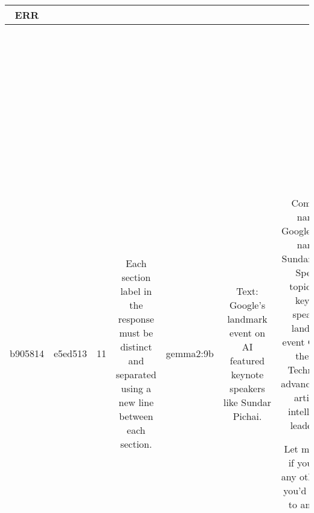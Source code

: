\begin{table}[h!]
\begin{tabular}{|c|c|c|c|c|c|c|c|c|c|}
ERR & \\
\hline
b905814 & e5ed513 & 11 & Each section label in the response must be distinct and separated using a new line between each section. & gemma2:9b & Text: Google's landmark event on AI featured keynote speakers like Sundar Pichai. & Company names: Google 
People names: Sundar Pichai
Specific topics: AI, keynote speakers, landmark event
General themes: Technology advancements, artificial intelligence leadership  


Let me know if you have any other text you'd like me to analyze! & ok & The chatbot's output provides distinct categories in separate lists as per the required format: "Company names", "People names", "Specific topics", and "General themes". Each is clearly marked and followed by a list separated by commas, matching the expected structure outlined in the description. Since there are no checks that require knowing the input text, the output adheres directly to the format requirement stipulated. 

No violation.
OK & \\
\hline
9c600dc & e5ed513 & 11 & Each section label in the response must be distinct and separated using a new line between each section. & gemma2:9b & Text: Intel's new chipset was introduced at the conference, offering significant power efficiency. & Company names: Intel 
People names: - 
Specific topics: chipsets, power efficiency, conferences
General themes: technology advancements, innovation   & err & Upon examining the chatbot's output, the structure aligns with the format specified in the description. The output contains sections for company names, people names, specific topics, and general themes. However, there is an inconsistency with the 'People names' section, which contains a dash but does not repeat the word 'names' afterwards. The description specifies a format using "-||-" which should translate to a repeated list element name after the initial content list, even if it's empty. Therefore 'People names:' should have been followed by a space and another 'People names:' to indicate an correctly formatted empty list. This constitutes a violation of the specified format.

Explanation of Violations: 
The output does not fully comply with the description because the 'People names' section is formatted incorrectly. The expected format calls for "-||-", indicating that for empty lists, the term 'People names:' should be repeated and separated by a space after the dash.

ERR & \\
\hline
14cca50 & e5ed513 & 11 & Each section label in the response must be distinct and separated using a new line between each section. & gemma2:9b & Text: Amazon and Walmart discussed logistics innovations at the annual summit. & Here are the entities extracted from the text you provided:


\end{tabular}
\end{table}
